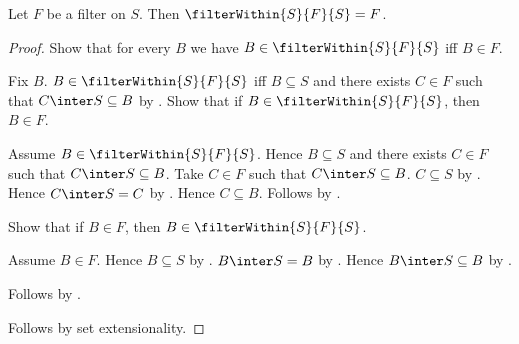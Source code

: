 \begin{proposition}\label{filter_within_carrier}
    Let $F$ be a filter on $S$.
    Then $\filterWithin{S}{F}{S}=F$.
\end{proposition}
\begin{proof}
    Show that for every $B$ we have $B\in\filterWithin{S}{F}{S}$ iff
        $B\in F$.
    \begin{subproof}
        Fix $B$.
        $B\in\filterWithin{S}{F}{S}$ iff
            $B\subseteq S$ and there exists $C\in F$ such that
            $C\inter S\subseteq B$ by .
        Show that if $B\in\filterWithin{S}{F}{S}$, then $B\in F$.
        \begin{subproof}
            Assume $B\in\filterWithin{S}{F}{S}$.
            Hence $B\subseteq S$ and there exists $C\in F$ such that
                $C\inter S\subseteq B$.
            Take $C\in F$ such that $C\inter S\subseteq B$.
            $C\subseteq S$ by .
            Hence $C\inter S=C$ by .
            Hence $C\subseteq B$.
            Follows by .
        \end{subproof}
        Show that if $B\in F$, then $B\in\filterWithin{S}{F}{S}$.
        \begin{subproof}
            Assume $B\in F$.
            Hence $B\subseteq S$ by .
            $B\inter S=B$ by .
            Hence $B\inter S\subseteq B$ by .
        \end{subproof}
        Follows by \auto.
    \end{subproof}
    Follows by set extensionality.
\end{proof}

